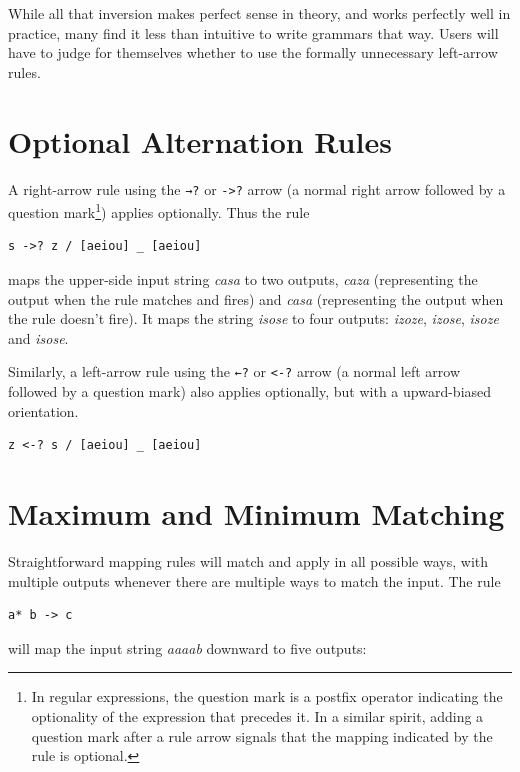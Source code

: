 \noindent 
While all that inversion makes perfect sense in theory, and works
perfectly well in practice,
many find it less than intuitive to write grammars that way.
Users will have to judge for themselves whether to use
the formally unnecessary left-arrow rules.

\section{Optional Alternation Rules}

A right-arrow rule using the \texttt{→?} or \texttt{->?} arrow (a normal right arrow followed by a question
mark\footnote{In regular expressions, the question mark is a postfix operator indicating the optionality of the expression that
precedes it.  In a similar spirit, adding a question mark after a rule arrow signals that the mapping indicated by the rule is
optional.}) applies optionally.  Thus
the rule

\begin{Verbatim}
s ->? z / [aeiou] _ [aeiou]
\end{Verbatim}

\noindent
maps the upper-side input string \emph{casa} to two outputs, \emph{caza} (representing the output when
the rule matches and fires) and
\emph{casa} (representing the output when the rule doesn't fire).  It 
maps the string \emph{isose} to four outputs:
\emph{izoze}, \emph{izose}, \emph{isoze} and \emph{isose}.

Similarly, a left-arrow rule using the \texttt{←?} or \texttt{<-?} arrow (a normal left arrow followed by a question mark) also
applies optionally, but with a upward-biased orientation.

\begin{Verbatim}
z <-? s / [aeiou] _ [aeiou]
\end{Verbatim}

\section{Maximum and Minimum Matching}

Straightforward mapping rules will match and apply in all possible ways, with multiple outputs
whenever there are multiple ways to match the input.  The rule

\begin{Verbatim}
a* b -> c
\end{Verbatim}

\noindent
will map the input string \emph{aaaab} downward to five outputs:

